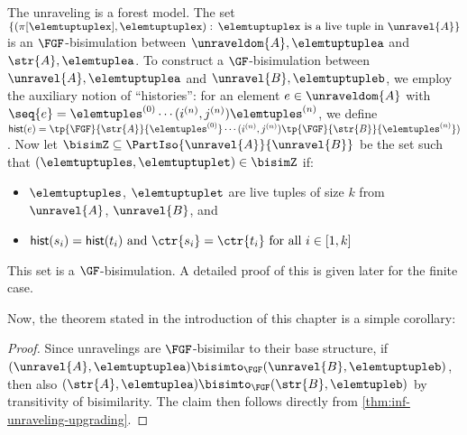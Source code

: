 \begin{proofsketch}
  The unraveling is a forest model.
  The set $\{(\pi[\elemtuptuplex], \elemtuptuplex):\, \elemtuptuplex\ \text{is a live tuple in}\ \unravel{A} \}$ is an $\FGF$-bisimulation between $\unraveldom{A}, \elemtuptuplea$ and $\str{A}, \elemtuplea$.
  To construct a $\GF$-bisimulation between $\unravel{A}, \elemtuptuplea$ and $\unravel{B}, \elemtuptupleb$, we employ the auxiliary notion of ``histories'': for an element $e \in \unraveldom{A}$ with $\seq{e} = \elemtuples^{(0)}\cdots(i^{(n)}, j^{(n)})\elemtuples^{(n)}$, we define $\mathsf{hist}(e) = \tp{\FGF}{\str{A}}{\elemtuples^{(0)}} \cdots (i^{(n)}, j^{(n)}) \tp{\FGF}{\str{B}}{\elemtuples^{(n)}})$.
  Now let $\bisimZ \subseteq \PartIso{\unravel{A}}{\unravel{B}}$ be the set such that $(\elemtuptuples, \elemtuptuplet) \in \bisimZ$ if:
  \begin{itemize}
    \item $\elemtuptuples$, $\elemtuptuplet$ are live tuples of size $k$ from $\unravel{A}$, $\unravel{B}$, and
    \item $\mathsf{hist}(s_{i}) = \mathsf{hist}(t_{i})\text{ and }\ctr{s_{i}} = \ctr{t_{i}}\text{ for all }i \in [1, k]$
  \end{itemize}
  This set is a $\GF$-bisimulation.
  A detailed proof of this is given later for the finite case.
\end{proofsketch}

Now, the theorem stated in the introduction of this chapter is a simple corollary:
\thminfupgrading
\begin{proof}
Since unravelings are $\FGF$-bisimilar to their base structure, if $(\unravel{A}, \elemtuptuplea) \bisimto_{\FGF} (\unravel{B}, \elemtuptupleb)$, then also $(\str{A}, \elemtuplea) \bisimto_{\FGF} (\str{B}, \elemtupleb)$ by transitivity of bisimilarity.
The claim then follows directly from \cref{thm:inf-unraveling-upgrading}.
\end{proof}
